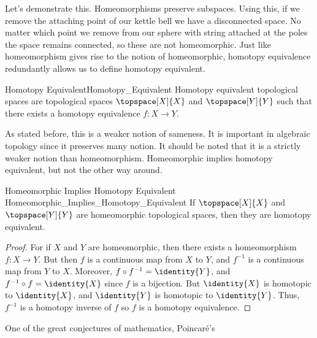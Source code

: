         \hfill
        \begin{minipage}{0.54\textwidth}
            Let's demonstrate this. Homeomorphisms preserve subspaces.
            Using this, if we remove the attaching point of our kettle
            bell we have a disconnected space. No matter which point we
            remove from our sphere with string attached at the poles the
            space remains connected, so these are not homeomorphic.
            Just like homeomorphism gives rise to the notion of
            homeomorphic, homotopy equivalence redundantly allows us to
            define homotopy equivalent.
        \end{minipage}
        \par\hfill\par
        \begin{fdefinition}{Homotopy Equivalent}{Homotopy_Equivalent}
            Homotopy equivalent topological spaces are topological
            spaces $\topspace[X]{X}$ and $\topspace[Y]{Y}$ such that
            there exists a homotopy equivalence $f:X\rightarrow{Y}$.
        \end{fdefinition}
        As stated before, this is a weaker notion of sameness. It is
        important in algebraic topology since it preserves many notion.
        It should be noted that it is a strictly weaker notion than
        homeomorphism. Homeomorphic implies homotopy equivalent, but not
        the other way around.
        \begin{ltheorem}{Homeomorphic Implies Homotopy Equivalent}
                        {Homeomorphic_Implies_Homotopy_Equivalent}
            If $\topspace[X]{X}$ and $\topspace[Y]{Y}$ are homeomorphic
            topological spaces, then they are homotopy equivalent.
        \end{ltheorem}
        \begin{proof}
            For if $X$ and $Y$ are homeomorphic, then there exists a
            homeomorphism $f:X\rightarrow{Y}$. But then $f$ is a
            continuous map from $X$ to $Y$, and $f^{-1}$ is a continuous
            map from $Y$ to $X$. Moreover,
            ${f}\circ{f^{-1}}=\identity{Y}$, and
            ${f^{-1}}\circ{f}=\identity{X}$ since $f$ is a bijection.
            But $\identity{X}$ is homotopic to $\identity{X}$, and
            $\identity{Y}$ is homotopic to $\identity{Y}$. Thus,
            $f^{\minus{1}}$ is a homotopy inverse of $f$ so $f$ is a
            homotopy equivalence.
        \end{proof}
        One of the great conjectures of mathematics, Poincar\'{e}'s
